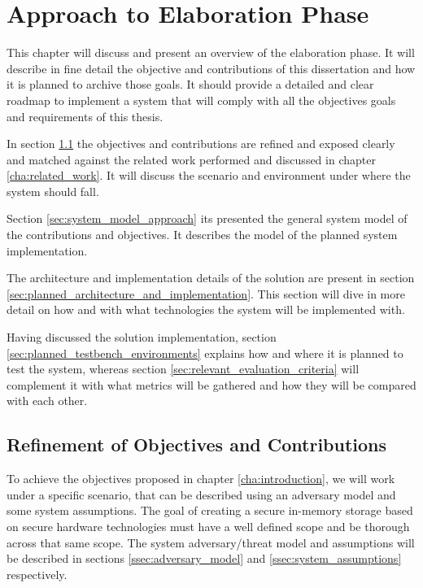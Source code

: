 
\chapter{Approach to Elaboration Phase}
\label{cha:approach_to_elaboration_phase}

This chapter will discuss and present an overview of the elaboration phase. It will describe in fine detail the objective and contributions of this dissertation and how it is planned to archive those goals. It should provide a detailed and clear roadmap to implement a system that will comply with all the objectives goals and requirements of this thesis.

In section \ref{sec:refinement_of_objectives_and_contributions} the objectives and contributions are refined and exposed clearly and matched against the related work performed and discussed in chapter \ref{cha:related_work}. It will discuss the scenario and environment under where the system should fall.

Section \ref{sec:system_model_approach} its presented the general system model of the contributions and objectives. It describes the model of the planned system implementation.

The architecture and implementation details of the solution are present in section \ref{sec:planned_architecture_and_implementation}. This section will dive in more detail on how and with what technologies the system will be implemented with.

Having discussed the solution implementation, section \ref{sec:planned_testbench_environments} explains how and where it is planned to test the system, whereas section \ref{sec:relevant_evaluation_criteria} will complement it with what metrics will be gathered and how they will be compared with each other.

\section{Refinement of Objectives and Contributions} %
\label{sec:refinement_of_objectives_and_contributions}

To achieve the objectives proposed in chapter \ref{cha:introduction}, we will work under a specific scenario, that can be described using an adversary model and some system assumptions. The goal of creating a secure in-memory storage based on secure hardware technologies must have a well defined scope and be thorough across that same scope. The system adversary/threat model and assumptions will be described in sections \ref{ssec:adversary_model} and \ref{ssec:system_assumptions} respectively.

